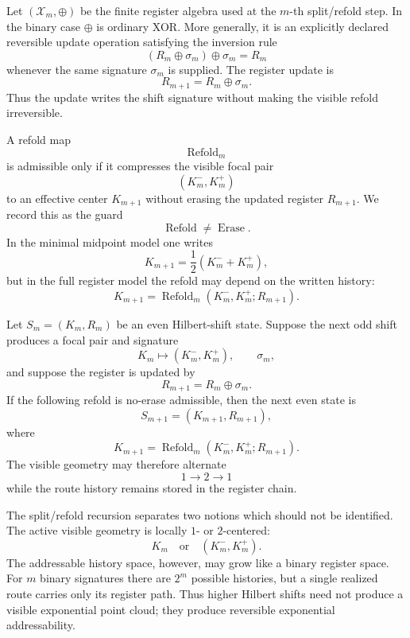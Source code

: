 \begin{definition}
\label{def:xor-like-register-update}
Let \((\mathcal X_m,\oplus)\) be the finite register algebra used at the
\(m\)-th split/refold step.  In the binary case \(\oplus\) is ordinary
XOR.  More generally, it is an explicitly declared reversible update
operation satisfying the inversion rule
\[
  (R_m\oplus\sigma_m)\oplus\sigma_m=R_m
\]
whenever the same signature \(\sigma_m\) is supplied.  The register update
is
\[
  R_{m+1}=R_m\oplus\sigma_m.
\]
Thus the update writes the shift signature without making the visible
refold irreversible.
\end{definition}

\begin{definition}
\label{def:no-erase-refold-guard}
A refold map
\[
  \operatorname{Refold}_m
\]
is admissible only if it compresses the visible focal pair
\[
  (K_m^-,K_m^+)
\]
to an effective center \(K_{m+1}\) without erasing the updated register
\(R_{m+1}\).  We record this as the guard
\[
  \boxed{\operatorname{Refold}\neq \operatorname{Erase}.}
\]
In the minimal midpoint model one writes
\[
  K_{m+1}
  =
  \frac12(K_m^-+K_m^+),
\]
but in the full register model the refold may depend on the written
history:
\[
  K_{m+1}
  =
  \operatorname{Refold}_m(K_m^-,K_m^+;R_{m+1}).
\]
\end{definition}

\begin{lemma}
\label{lem:hs-split-refold-recursion}
Let \(S_m=(K_m,R_m)\) be an even Hilbert-shift state.  Suppose the next
odd shift produces a focal pair and signature
\[
  K_m\mapsto(K_m^-,K_m^+),
  \qquad
  \sigma_m,
\]
and suppose the register is updated by
\[
  R_{m+1}=R_m\oplus\sigma_m.
\]
If the following refold is no-erase admissible, then the next even state is
\[
  S_{m+1}
  =
  (K_{m+1},R_{m+1}),
\]
where
\[
  K_{m+1}
  =
  \operatorname{Refold}_m(K_m^-,K_m^+;R_{m+1}).
\]
The visible geometry may therefore alternate
\[
  1\longrightarrow2\longrightarrow1
\]
while the route history remains stored in the register chain.
\end{lemma}

\begin{remark}
\label{rem:active-geometry-vs-history}
The split/refold recursion separates two notions which should not be
identified.  The active visible geometry is locally \(1\)- or \(2\)-centered:
\[
  K_m
  \quad\text{or}\quad
  (K_m^-,K_m^+).
\]
The addressable history space, however, may grow like a binary register
space.  For \(m\) binary signatures there are \(2^m\) possible histories,
but a single realized route carries only its register path.  Thus higher
Hilbert shifts need not produce a visible exponential point cloud; they
produce reversible exponential addressability.
\end{remark}


